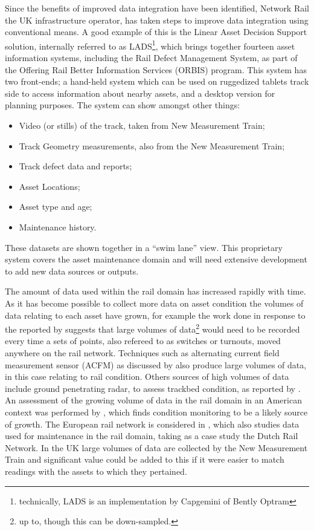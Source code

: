 Since the benefits of improved data integration have been identified, Network Rail the UK infrastructure operator, has taken steps to improve data integration using conventional means. A good example of this is the Linear Asset Decision Support solution, internally referred to as LADS\footnote{technically, LADS is an implementation by Capgemini of Bently Optram}, which brings together fourteen asset information systems, including the Rail Defect Management System, as part of the Offering Rail Better Information Services (ORBIS) program. This system has two front-ends; a hand-held system which can be used on ruggedized tablets track side to access information about nearby assets, and a desktop version for planning purposes. The system can show amongst other things:
\begin{itemize}
    \item Video (or stills) of the track, taken from New Measurement Train;
    \item Track Geometry measurements, also from the New Measurement Train;
    \item Track defect data and reports;
    \item Asset Locations;
    \item Asset type and age;
    \item Maintenance history.  
\end{itemize} 
These datasets are shown together in a ``swim lane'' view. This proprietary system covers the asset maintenance domain and will need extensive development to add new data sources or outputs. 
 
The amount of data used within the rail domain has increased rapidly with time. As it has become possible to collect more data on asset condition the volumes of data relating to each asset have grown, for example the work done in response to the  reported by \citet{Tutcher2015a} suggests that large volumes of data\footnote{up to, though this can be down-sampled.} would need to be recorded every time a sets of points, also refereed to as switches or turnouts, moved anywhere on the rail network. Techniques such as alternating current field measurement sensor (ACFM) as discussed by \citet{Rowshandel2013} also produce large volumes of data, in this case relating to rail condition. Others sources of high volumes of data include ground penetrating radar, to assess trackbed condition, as reported by \citet{eriksen2004improved}. An assessment of the growing volume of data in the rail domain in an American context was performed by \citet{Zarembski}, which finds condition monitoring to be a likely source of growth. The European rail network is considered in \citet{Nunez2014}, which also studies data used for maintenance in the rail domain, taking as a case study the Dutch Rail Network. In the UK large volumes of  data are collected by the New Measurement Train and significant value could be added to this if it were easier to match readings with the assets to which they pertained.

